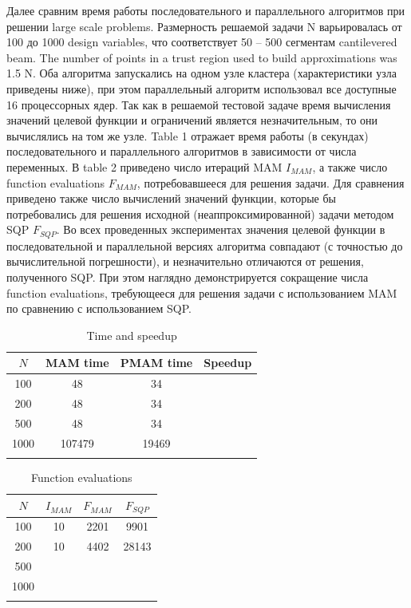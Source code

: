 \documentclass[runningheads,a4paper]{llncs}
\begin{document}
\Russian
Далее сравним время работы последовательного и параллельного алгоритмов при решении large scale problems. 
Размерность решаемой задачи N варьировалась от 100 до 1000 design variables, что соответствует 50 – 500 сегментам cantilevered beam. The number of points in a trust region used to build approximations was 1.5 N. 
Оба алгоритма запускались на одном узле кластера (характеристики узла приведены ниже), при этом параллельный алгоритм использовал все доступные 16 процессорных ядер. Так как в решаемой тестовой задаче время вычисления значений целевой функции и ограничений является незначительным, то они вычислялись на том же узле.
Table 1 отражает время работы (в секундах) последовательного и параллельного алгоритмов в зависимости от числа переменных. В table 2 приведено число итераций MAM $I_{MAM}$, а также число function evaluations $F_{MAM}$, потребовавшееся для решения задачи. Для сравнения приведено также число вычислений значений функции, которые бы потребовались для решения исходной (неаппроксимированной) задачи методом SQP $F_{SQP}$. Во всех проведенных экспериментах значения целевой функции в последовательной и параллельной версиях алгоритма совпадают (с точностью до вычислительной погрешности), и незначительно отличаются от решения, полученного SQP. При этом наглядно демонстрируется сокращение числа function evaluations, требующееся для решения задачи с использованием MAM по сравнению с использованием SQP.

\begin{table}
	\caption{Time and speedup}
	\label{tab:1}
	\center
	\begin{tabular}{cccc}
		\hline\noalign{\smallskip}
		$N$ & MAM time & PMAM time & Speedup \\
		\hline\noalign{\smallskip}
		100 & 48 &  34 &   \\
		200 & 48 &  34 &   \\
		500 & 48 &  34 &   \\
		1000 & 107479  &  19469 &   \\
		\noalign{\smallskip}\hline
	\end{tabular}
\end{table}

\begin{table}
	\caption{Function evaluations}
	\label{tab:1}
	\center
	\begin{tabular}{cccc}
		\hline\noalign{\smallskip}
		$N$ & $I_{MAM}$  & $F_{MAM}$ & $F_{SQP}$ \\
		\hline\noalign{\smallskip}
		100 & 10 &  2201 & 9901 \\
		200 & 10 &  4402 & 28143 \\
		500 &  &   &  \\
		1000 &  &   &  \\
		\noalign{\smallskip}\hline
	\end{tabular}
\end{table}
\end{document}
